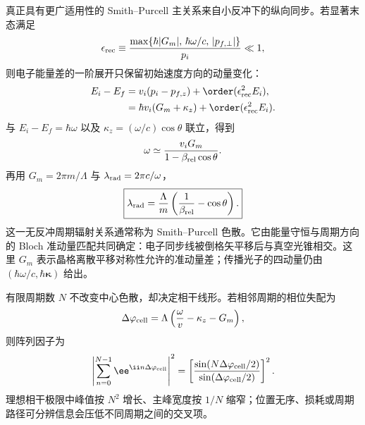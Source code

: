 \begin{exbox}
真正具有更广适用性的 Smith--Purcell 主关系来自小反冲下的纵向同步。若显著末态满足
\begin{equation*}
\epsilon_{\rm rec}\equiv
\frac{\max\{\hbar|G_m|,\,\hbar\omega/c,\,|p_{f,\perp}|\}}{p_i}\ll1,
\end{equation*}
则电子能量差的一阶展开只保留初始速度方向的动量变化：
\begin{align*}
E_i-E_f
&=v_i(p_i-p_{f,z})+\order(\epsilon_{\rm rec}^2E_i),\\
&=\hbar v_i(G_m+\kappa_z)+\order(\epsilon_{\rm rec}^2E_i).
\end{align*}
与 $E_i-E_f=\hbar\omega$ 以及 $\kappa_z=(\omega/c)\cos\theta$ 联立，得到
\begin{equation*}
\omega\simeq\frac{v_iG_m}{1-\beta_{\rm rel}\cos\theta}.
\end{equation*}
再用 $G_m=2\pi m/\Lambda$ 与 $\lambda_{\rm rad}=2\pi c/\omega$，
\begin{equation}
\boxed{
\lambda_{\rm rad}
=\frac{\Lambda}{m}
\left(\frac1{\beta_{\rm rel}}-\cos\theta\right).}
\label{eq:smith_purcell_wavelength}\end{equation}
这一无反冲周期辐射关系通常称为 Smith--Purcell 色散。它由能量守恒与周期方向的 Bloch 准动量匹配共同确定：电子同步线被倒格矢平移后与真空光锥相交。这里 $G_m$ 表示晶格离散平移对称性允许的准动量差；传播光子的四动量仍由 $(\hbar\omega/c,\hbar\boldsymbol\kappa)$ 给出。
\end{exbox}



有限周期数 $N$ 不改变中心色散，却决定相干线形。若相邻周期的相位失配为
\begin{equation*}
\Delta\varphi_{\rm cell}=\Lambda\left(\frac{\omega}{v}-\kappa_z-G_m\right),
\end{equation*}
则阵列因子为
\begin{equation*}
\left|\sum_{n=0}^{N-1}\ee^{\ii n\Delta\varphi_{\rm cell}}\right|^2
=\left[\frac{\sin(N\Delta\varphi_{\rm cell}/2)}{\sin(\Delta\varphi_{\rm cell}/2)}\right]^2.
\end{equation*}
理想相干极限中峰值按 $N^2$ 增长、主峰宽度按 $1/N$ 缩窄；位置无序、损耗或周期路径可分辨信息会压低不同周期之间的交叉项。

